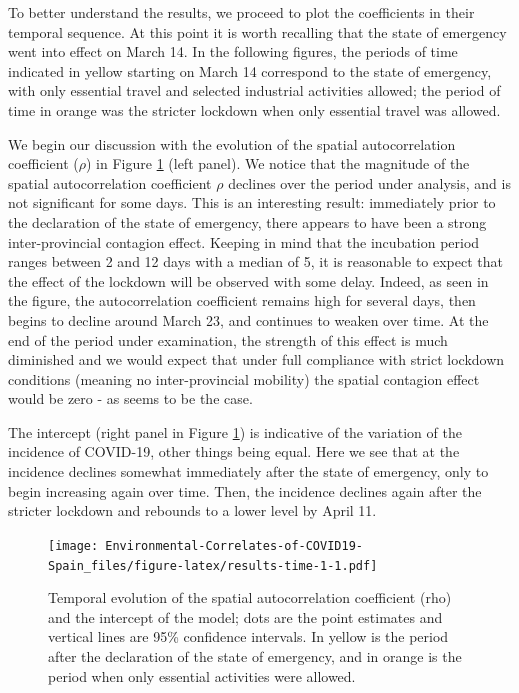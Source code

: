 \documentclass[]{elsarticle} %
\begin{document}
To better understand the results, we proceed to plot the coefficients in
their temporal sequence. At this point it is worth recalling that the
state of emergency went into effect on March 14. In the following
figures, the periods of time indicated in yellow starting on March 14
correspond to the state of emergency, with only essential travel and
selected industrial activities allowed; the period of time in orange was
the stricter lockdown when only essential travel was allowed.

We begin our discussion with the evolution of the spatial
autocorrelation coefficient (\(\rho\)) in Figure
\ref{fig:results-time-1} (left panel). We notice that the magnitude of
the spatial autocorrelation coefficient \(\rho\) declines over the
period under analysis, and is not significant for some days. This is an
interesting result: immediately prior to the declaration of the state of
emergency, there appears to have been a strong inter-provincial
contagion effect. Keeping in mind that the incubation period ranges
between 2 and 12 days with a median of 5, it is reasonable to expect
that the effect of the lockdown will be observed with some delay.
Indeed, as seen in the figure, the autocorrelation coefficient remains
high for several days, then begins to decline around March 23, and
continues to weaken over time. At the end of the period under
examination, the strength of this effect is much diminished and we would
expect that under full compliance with strict lockdown conditions
(meaning no inter-provincial mobility) the spatial contagion effect
would be zero - as seems to be the case.

The intercept (right panel in Figure \ref{fig:results-time-1}) is
indicative of the variation of the incidence of COVID-19, other things
being equal. Here we see that at the incidence declines somewhat
immediately after the state of emergency, only to begin increasing again
over time. Then, the incidence declines again after the stricter
lockdown and rebounds to a lower level by April 11.

\begin{figure}
\centering
\texttt{[image: Environmental-Correlates-of-COVID19-Spain\_files/figure-latex/results-time-1-1.pdf]}
\caption{\label{fig:results-time-1}Temporal evolution of the spatial
autocorrelation coefficient (rho) and the intercept of the model; dots
are the point estimates and vertical lines are 95\% confidence
intervals. In yellow is the period after the declaration of the state of
emergency, and in orange is the period when only essential activities
were allowed.}
\end{figure}
\end{document}
